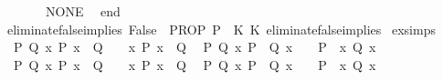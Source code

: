 \begin{isabellebody}
\ \ \ \ {\isacharbar}{\kern0pt}\ {\isacharunderscore}{\kern0pt}\ {\isacharequal}{\kern0pt}{\isachargreater}{\kern0pt}\ NONE\isanewline
\ \ end\isanewline
{\isacartoucheclose}\isanewline
\isanewline
{}\isamarkupfalse%
\ eliminate{\isacharunderscore}{\kern0pt}false{\isacharunderscore}{\kern0pt}implies\ {\isacharparenleft}{\kern0pt}{\isachardoublequoteopen}False\ {\isasymLongrightarrow}\ PROP\ P{\isachardoublequoteclose}{\isacharparenright}{\kern0pt}\ {\isacharequal}{\kern0pt}\ {\isacartoucheopen}K\ {\isacharparenleft}{\kern0pt}K\ eliminate{\isacharunderscore}{\kern0pt}false{\isacharunderscore}{\kern0pt}implies{\isacharparenright}{\kern0pt}{\isacartoucheclose}%
\endisatagML
{\isafoldML}%
%
\isadelimML
\isanewline
%
\endisadelimML
\isanewline
\isanewline
{}\isamarkupfalse%
\ ex{\isacharunderscore}{\kern0pt}simps{\isacharcolon}{\kern0pt}\isanewline
\ \ {\isachardoublequoteopen}{\isasymAnd}P\ Q{\isachardot}{\kern0pt}\ {\isacharparenleft}{\kern0pt}{\isasymexists}x{\isachardot}{\kern0pt}\ P\ x\ {\isasymand}\ Q{\isacharparenright}{\kern0pt}\ \ \ {\isacharequal}{\kern0pt}\ {\isacharparenleft}{\kern0pt}{\isacharparenleft}{\kern0pt}{\isasymexists}x{\isachardot}{\kern0pt}\ P\ x{\isacharparenright}{\kern0pt}\ {\isasymand}\ Q{\isacharparenright}{\kern0pt}{\isachardoublequoteclose}\isanewline
\ \ {\isachardoublequoteopen}{\isasymAnd}P\ Q{\isachardot}{\kern0pt}\ {\isacharparenleft}{\kern0pt}{\isasymexists}x{\isachardot}{\kern0pt}\ P\ {\isasymand}\ Q\ x{\isacharparenright}{\kern0pt}\ \ \ {\isacharequal}{\kern0pt}\ {\isacharparenleft}{\kern0pt}P\ {\isasymand}\ {\isacharparenleft}{\kern0pt}{\isasymexists}x{\isachardot}{\kern0pt}\ Q\ x{\isacharparenright}{\kern0pt}{\isacharparenright}{\kern0pt}{\isachardoublequoteclose}\isanewline
\ \ {\isachardoublequoteopen}{\isasymAnd}P\ Q{\isachardot}{\kern0pt}\ {\isacharparenleft}{\kern0pt}{\isasymexists}x{\isachardot}{\kern0pt}\ P\ x\ {\isasymor}\ Q{\isacharparenright}{\kern0pt}\ \ \ {\isacharequal}{\kern0pt}\ {\isacharparenleft}{\kern0pt}{\isacharparenleft}{\kern0pt}{\isasymexists}x{\isachardot}{\kern0pt}\ P\ x{\isacharparenright}{\kern0pt}\ {\isasymor}\ Q{\isacharparenright}{\kern0pt}{\isachardoublequoteclose}\isanewline
\ \ {\isachardoublequoteopen}{\isasymAnd}P\ Q{\isachardot}{\kern0pt}\ {\isacharparenleft}{\kern0pt}{\isasymexists}x{\isachardot}{\kern0pt}\ P\ {\isasymor}\ Q\ x{\isacharparenright}{\kern0pt}\ \ \ {\isacharequal}{\kern0pt}\ {\isacharparenleft}{\kern0pt}P\ {\isasymor}\ {\isacharparenleft}{\kern0pt}{\isasymexists}x{\isachardot}{\kern0pt}\ Q\ x{\isacharparenright}{\kern0pt}{\isacharparenright}{\kern0pt}{\isachardoublequoteclose}\isanewline

\end{isabellebody}
